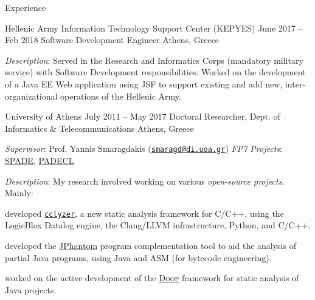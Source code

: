 \documentclass{resume}
\begin{document}
\begin{rSection}{Experience}

\begin{rSubsection}
  {Hellenic Army Information Technology Support Center (KEPYES)}
  {June 2017 -- Feb 2018}
  {Software Development Engineer}
  {Athens, Greece}
\item \emph{Description}: Served in the Research and Informatics Corps
  (mandatory military service) with Software Development
  responsibilities. Worked on the development of a Java EE Web
  application using JSF to support existing and add new,
  inter-organizational operations of the Hellenic Army.
\end{rSubsection}


\begin{rSubsection}
  {University of Athens}
  {July 2011 -- May 2017}
  {Doctoral Researcher, Dept. of Informatics \& Telecommunications}
  {Athens, Greece}
\item \emph{Supervisor}: Prof. Yannis Smaragdakis
  (\href{mailto:smaragd@di.uoa.gr}{\nolinkurl{smaragd@di.uoa.gr}})
  \hfill{%
  \emph{FP7 Projects}:
  \href{http://cordis.europa.eu/project/rcn/104361_en.html}{SPADE},
  \href{http://cordis.europa.eu/project/rcn/95729_en.html}{PADECL}}
\item \emph{Description}: My research involved working on various
  \emph{open-source projects}. Mainly: \vspace{-0.5em}
  \begin{compactitem}[--]
  \item developed
    \href{https://github.com/plast-lab/cclyzer}{\texttt{cclyzer}}, a new static
    analysis framework for C/C++, using the LogicBlox Datalog engine,
    the Clang/LLVM infrastructure, Python, and C/C++.
  \item developed the
    \href{https://github.com/gbalats/jphantom}{JPhantom} program
    complementation tool to aid the analysis of partial Java programs,
    using Java and ASM (for bytecode engineering).
  \item worked on the active development of the
    \href{https://bitbucket.org/yanniss/doop}{\textsc{Doop}}
    framework for static analysis of Java projects.
  \end{compactitem}
\end{rSubsection}


\end{rSection}
\end{document}
